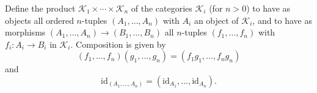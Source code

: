 Define the product $\mathcal{K}_1 \times \cdots \times \mathcal{K}_n$ of the categories $\mathcal{K}_i$ (for $n > 0$) to have as objects all ordered $n$-tuples $(A_1, \ldots, A_n)$ with $A_i$ an object of $\mathcal{K}_i$, and to have as morphisms $(A_1, \ldots, A_n) \to (B_1, \ldots, B_n)$ all $n$-tuples $(f_1, \ldots, f_n)$ with $f_i: A_i \to B_i$ in $\mathcal{K}_i$. Composition is given by
$$(f_1, \ldots, f_n)(g_1, \ldots, g_n) = (f_1 g_1, \ldots, f_n g_n)$$
and
$$\mathrm{id}_{(A_1, \ldots, A_n)} = (\mathrm{id}_{A_1}, \ldots, \mathrm{id}_{A_n}).$$
